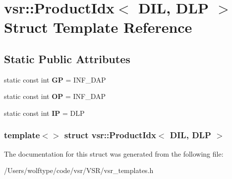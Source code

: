 \hypertarget{structvsr_1_1_product_idx_3_01_d_i_l_00_01_d_l_p_01_4}{\section{vsr\-:\-:Product\-Idx$<$ D\-I\-L, D\-L\-P $>$ Struct Template Reference}
\label{structvsr_1_1_product_idx_3_01_d_i_l_00_01_d_l_p_01_4}
}
\subsection*{Static Public Attributes}
\begin{DoxyCompactItemize}
\item 
\hypertarget{structvsr_1_1_product_idx_3_01_d_i_l_00_01_d_l_p_01_4_a5a811536f21c315b57b082cb2fb10db7}{static const int {\bfseries G\-P} = I\-N\-F\-\_\-\-D\-A\-P}\label{structvsr_1_1_product_idx_3_01_d_i_l_00_01_d_l_p_01_4_a5a811536f21c315b57b082cb2fb10db7}

\item 
\hypertarget{structvsr_1_1_product_idx_3_01_d_i_l_00_01_d_l_p_01_4_a2084ebb11edd5cc6ef516bd28c34bc57}{static const int {\bfseries O\-P} = I\-N\-F\-\_\-\-D\-A\-P}\label{structvsr_1_1_product_idx_3_01_d_i_l_00_01_d_l_p_01_4_a2084ebb11edd5cc6ef516bd28c34bc57}

\item 
\hypertarget{structvsr_1_1_product_idx_3_01_d_i_l_00_01_d_l_p_01_4_afde89e507deecc0d1982c6ea9738713a}{static const int {\bfseries I\-P} = D\-L\-P}\label{structvsr_1_1_product_idx_3_01_d_i_l_00_01_d_l_p_01_4_afde89e507deecc0d1982c6ea9738713a}

\end{DoxyCompactItemize}
\subsubsection*{template$<$$>$ struct vsr\-::\-Product\-Idx$<$ D\-I\-L, D\-L\-P $>$}



The documentation for this struct was generated from the following file\-:\begin{DoxyCompactItemize}
\item 
/\-Users/wolftype/code/vsr/\-V\-S\-R/vsr\-\_\-templates.\-h\end{DoxyCompactItemize}
